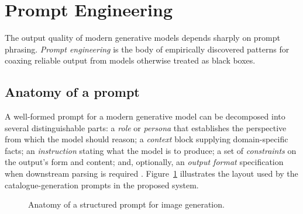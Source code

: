 \section{Prompt Engineering}
\label{sec:prompt-engineering}

The output quality of modern generative models depends sharply on prompt phrasing. \emph{Prompt engineering} is the body of empirically discovered patterns for coaxing reliable output from models otherwise treated as black boxes.

\subsection{Anatomy of a prompt}

A well-formed prompt for a modern generative model can be decomposed into several distinguishable parts: a \emph{role} or \emph{persona} that establishes the perspective from which the model should reason; a \emph{context} block supplying domain-specific facts; an \emph{instruction} stating what the model is to produce; a set of \emph{constraints} on the output's form and content; and, optionally, an \emph{output format} specification when downstream parsing is required \cite{anthropic_prompting,white2023promptpatterns}. Figure~\ref{fig:prompt-anatomy} illustrates the layout used by the catalogue-generation prompts in the proposed system.

\begin{figure}[ht]
\centering
\caption{Anatomy of a structured prompt for image generation.}
\label{fig:prompt-anatomy}
\end{figure}

